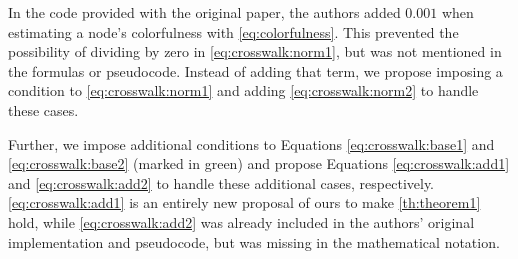 
In the code provided with the original paper, the authors added $0.001$ when estimating a node's colorfulness with \autoref{eq:colorfulness}. 
This prevented the possibility of dividing by zero in \autoref{eq:crosswalk:norm1}, but was not mentioned in the formulas or pseudocode.
Instead of adding that term, we propose imposing a condition to \autoref{eq:crosswalk:norm1} and adding \autoref{eq:crosswalk:norm2} to handle these cases.

Further, we impose additional conditions to Equations \ref{eq:crosswalk:base1} and \ref{eq:crosswalk:base2} (marked in green) and propose Equations \ref{eq:crosswalk:add1} and \ref{eq:crosswalk:add2} to handle these additional cases, respectively. \autoref{eq:crosswalk:add1} is an entirely new proposal of ours to make \autoref{th:theorem1} hold, while \autoref{eq:crosswalk:add2} was already included in the authors' original implementation and pseudocode, but was missing in the mathematical notation.



